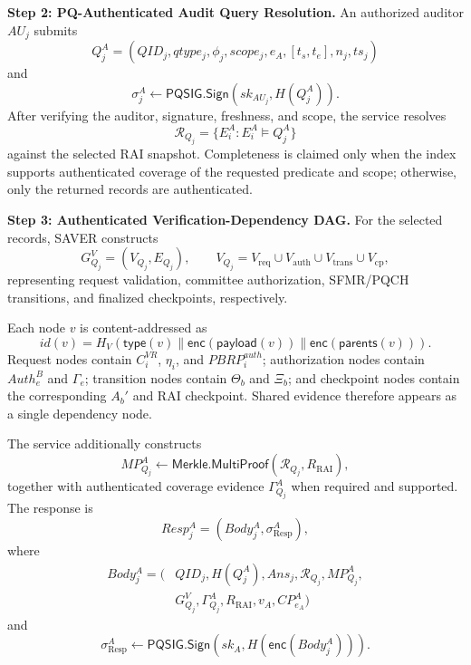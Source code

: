\documentclass[lettersize,journal]{IEEEtran}
\begin{document}
\medskip
\noindent\textbf{Step 2: PQ-Authenticated Audit Query Resolution.}
An authorized auditor $AU_j$ submits
\begin{equation}
Q_j^A=
(QID_j,qtype_j,\phi_j,scope_j,e_A,[t_s,t_e],n_j,ts_j)
\end{equation}
and
\begin{equation}
\sigma_j^A
\leftarrow
\mathsf{PQSIG.Sign}(sk_{AU_j},H(Q_j^A)).
\end{equation}
After verifying the auditor, signature, freshness, and scope, the
service resolves
\begin{equation}
\mathcal{R}_{Q_j}
=
\{E_i^A:E_i^A\models Q_j^A\}
\end{equation}
against the selected RAI snapshot. Completeness is claimed only when
the index supports authenticated coverage of the requested predicate
and scope; otherwise, only the returned records are authenticated.

\medskip
\noindent\textbf{Step 3: Authenticated Verification-Dependency DAG.}
For the selected records, SAVER constructs
\begin{equation}
G_{Q_j}^{V}=(V_{Q_j},E_{Q_j}),
\qquad
V_{Q_j}
=
V_{\mathrm{req}}\cup V_{\mathrm{auth}}
\cup V_{\mathrm{trans}}\cup V_{\mathrm{cp}},
\end{equation}
representing request validation, committee authorization, SFMR/PQCH
transitions, and finalized checkpoints, respectively.

Each node $v$ is content-addressed as
\begin{equation}
id(v)=
H_V(
\mathsf{type}(v)\parallel
\mathsf{enc}(\mathsf{payload}(v))\parallel
\mathsf{enc}(\mathsf{parents}(v))).
\end{equation}
Request nodes contain $C_i^{VR}$, $\eta_i$, and
$PBRP_i^{auth}$; authorization nodes contain $Auth_e^B$ and
$\Gamma_e$; transition nodes contain $\Theta_b$ and $\Xi_b$; and
checkpoint nodes contain the corresponding $A_b'$ and RAI checkpoint.
Shared evidence therefore appears as a single dependency node.

The service additionally constructs
\begin{equation}
MP_{Q_j}^A
\leftarrow
\mathsf{Merkle.MultiProof}
(\mathcal{R}_{Q_j},R_{\mathrm{RAI}}),
\end{equation}
together with authenticated coverage evidence $\Gamma_{Q_j}^A$ when
required and supported. The response is
\begin{equation}
Resp_j^A=(Body_j^A,\sigma_{\mathrm{Resp}}^A),
\end{equation}
where
\begin{equation}
\begin{aligned}
Body_j^A=\big(
&QID_j,H(Q_j^A),Ans_j,\mathcal{R}_{Q_j},MP_{Q_j}^A,\\
&G_{Q_j}^{V},\Gamma_{Q_j}^{A},
R_{\mathrm{RAI}},v_A,CP_{e_A}^A\big)
\end{aligned}
\end{equation}
and
\begin{equation}
\sigma_{\mathrm{Resp}}^A
\leftarrow
\mathsf{PQSIG.Sign}
(sk_A,H(\mathsf{enc}(Body_j^A))).
\end{equation}
\end{document}

